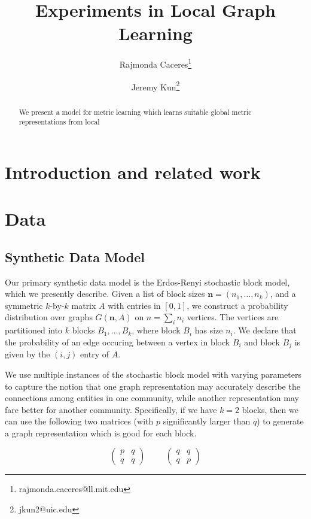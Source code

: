 \documentclass{article}[11pt]
\title{Experiments in Local Graph Learning}
\author[1]{Rajmonda Caceres\thanks{rajmonda.caceres@ll.mit.edu}}
\author[2]{Jeremy Kun\thanks{jkun2@uic.edu}}
\affil[1]{MIT Lincoln Laboratory}
\affil[2]{Deparment of Mathematics, Statistics, and Computer Science, University of Illinois at Chicago}
\date{}
\begin{document}
\maketitle

\begin{abstract} 
We present a model for metric learning which learns suitable global metric
representations from local 
\end{abstract}

\section{Introduction and related work}

\section{Data}
\subsection{Synthetic Data Model}
Our primary synthetic data model is the Erdos-Renyi stochastic block model,
which we presently describe. Given a list of block sizes $\mathbf{n} = (n_1,
\dots, n_k)$, and a symmetric $k$-by-$k$ matrix $A$ with entries in $[0,1]$, we
construct a probability distribution over graphs $G(\mathbf{n}, A)$ on $n =
\sum_i n_i$ vertices. The vertices are partitioned into $k$ blocks $B_1, \dots,
B_k$, where block $B_i$ has size $n_i$. We declare that the probability of an
edge occuring between a vertex in block $B_i$ and block $B_j$ is given by the
$(i,j)$ entry of $A$.

We use multiple instances of the stochastic block model with varying parameters
to capture the notion that one graph representation may accurately describe the
connections among entities in one community, while another representation may
fare better for another community. Specifically, if we have $k = 2$ blocks,
then we can use the following two matrices (with $p$ significantly larger than
$q$) to generate a graph representation which is good for each block.

\[ 
   \begin{pmatrix}
   p & q \\ 
   q & q 
   \end{pmatrix}
\hspace{1cm}
   \begin{pmatrix}
   q & q \\ 
   q & p 
   \end{pmatrix}
\] 
\end{document}
